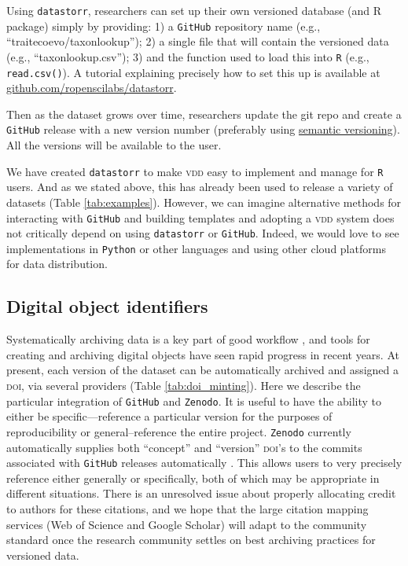 \documentclass[a4paper,11pt]{article}
\newcommand{\smurl}[1]{{\footnotesize\url{#1}}}
\begin{document}
Using \texttt{datastorr}, researchers can set up their own versioned database (and R package) simply by providing: 1) a \texttt{GitHub} repository name (e.g., ``traitecoevo/taxonlookup''); 2) a single file that will contain the versioned data (e.g., ``taxonlookup.csv''); 3) and the function used to load this into \texttt{R} (e.g., \texttt{read.csv()}). A tutorial explaining precisely how to set this up is available at \smurl{github.com/ropenscilabs/datastorr}.

Then as the dataset grows over time, researchers update the git repo and create a \texttt{GitHub} release with a new version number (preferably
using \href{http://semver.org/}{semantic versioning}). All the versions
will be available to the user. 

We have created \texttt{datastorr} to make \textsc{vdd} easy to implement and manage for \texttt{R} users. And as we stated above, this has already been used to release a variety of datasets (Table \ref{tab:examples}). However, we can imagine alternative methods for interacting with \texttt{GitHub} and building templates and adopting a \textsc{vdd} system does not critically depend on using \texttt{datastorr} or \texttt{GitHub}. Indeed, we would love to see implementations in \texttt{Python} or other languages and using other cloud platforms for data distribution.

\subsection{Digital object identifiers}

Systematically archiving data is a key part of good workflow \citep{Wilkinson-2016, Piwowar-2011, Whitlock-2011}, and tools for creating and archiving digital objects have seen rapid progress in recent years.  At present, each version of the dataset can be automatically archived and assigned a \textsc{doi}, via several providers (Table \ref{tab:doi_minting}).  Here we describe the particular integration of \texttt{GitHub} and \texttt{Zenodo}.  It is useful to have the ability to either be specific---reference a particular version for the purposes of reproducibility or general--reference the entire project.  \texttt{Zenodo} currently automatically supplies both ``concept'' and ``version'' \textsc{doi}'s to the commits associated with \texttt{GitHub} releases automatically \citep[Figure \ref{fig:semantic} and ][]{Nielsen-2017}.  This allows users to very precisely reference either generally or specifically, both of which may be appropriate in different situations.  There is an unresolved issue about properly allocating credit to authors for these citations, and we hope that the large citation mapping services (Web of Science and Google Scholar) will adapt to the community standard once the research community settles on best archiving practices for versioned data.
\end{document}
